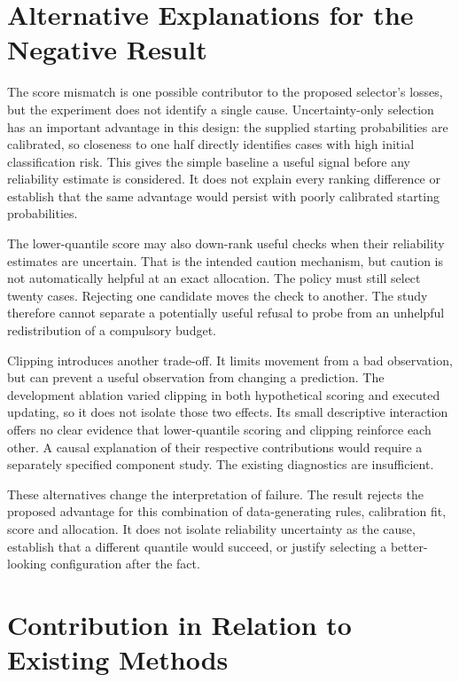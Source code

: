 \section{Alternative Explanations for the Negative Result}

The score mismatch is one possible contributor to the proposed selector's losses, but the experiment does not identify a single cause.
Uncertainty-only selection has an important advantage in this design: the supplied starting probabilities are calibrated,
so closeness to one half directly identifies cases with high initial classification risk. This gives the simple baseline
a useful signal before any reliability estimate is considered. It does not explain every ranking difference or establish
that the same advantage would persist with poorly calibrated starting probabilities.

The lower-quantile score may also down-rank useful checks when their reliability estimates are uncertain. That is the
intended caution mechanism, but caution is not automatically helpful at an exact allocation. The policy must still select
twenty cases. Rejecting one candidate moves the check to another. The study therefore cannot
separate a potentially useful refusal to probe from an unhelpful redistribution of a compulsory budget.

Clipping introduces another trade-off. It limits movement from a bad observation, but can prevent a useful observation from
changing a prediction. The development ablation varied clipping in both hypothetical scoring and executed updating, so it
does not isolate those two effects. Its small descriptive interaction offers no clear evidence that lower-quantile scoring
and clipping reinforce each other. A causal explanation of their respective contributions would require a separately
specified component study. The existing diagnostics are insufficient.

These alternatives change the interpretation of failure. The result rejects the proposed advantage for this combination
of data-generating rules, calibration fit, score and allocation. It does not isolate reliability uncertainty as the cause,
establish that a different quantile would succeed, or justify selecting a better-looking configuration after the fact.

\section{Contribution in Relation to Existing Methods}

